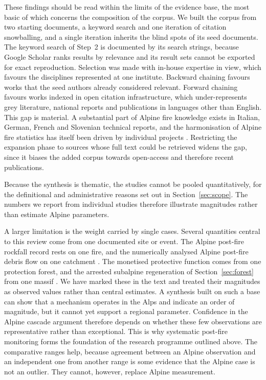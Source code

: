 \documentclass[11pt,a4paper]{article}
\begin{document}
\label{sec:limitations}
These findings should be read within the limits of the evidence base, the most basic of which concerns the composition of the corpus. We built the corpus from two starting documents, a keyword search and one iteration of citation snowballing, and a single iteration inherits the blind spots of its seed documents. The keyword search of Step~2 is documented by its search strings, because Google Scholar ranks results by relevance and its result sets cannot be exported for exact reproduction. Selection was made with in-house expertise in view, which favours the disciplines represented at one institute. Backward chaining favours works that the seed authors already considered relevant. Forward chaining favours works indexed in open citation infrastructure, which under-represents grey literature, national reports and publications in languages other than English. This gap is material. A substantial part of Alpine fire knowledge exists in Italian, German, French and Slovenian technical reports, and the harmonisation of Alpine fire statistics has itself been driven by individual projects \citep{valese_wildfires_2011}. Restricting the expansion phase to sources whose full text could be retrieved widens the gap, since it biases the added corpus towards open-access and therefore recent publications.

Because the synthesis is thematic, the studies cannot be pooled quantitatively, for the definitional and administrative reasons set out in Section~\ref{sec:scope}. The numbers we report from individual studies therefore illustrate magnitudes rather than estimate Alpine parameters.

A larger limitation is the weight carried by single cases. Several quantities central to this review come from one documented site or event. The Alpine post-fire rockfall record rests on one fire, and the numerically analysed Alpine post-fire debris flow on one catchment \citep{melzner_brief_2019, laporta_postwildfire_2025}. The monetised protective function comes from one protection forest, and the arrested subalpine regeneration of Section~\ref{sec:forest} from one massif \citep{moos_climate_2021, degiuli_arrested_2024}. We have marked these in the text and treated their magnitudes as observed values rather than central estimates. A synthesis built on such a base can show that a mechanism operates in the Alps and indicate an order of magnitude, but it cannot yet support a regional parameter. Confidence in the Alpine cascade argument therefore depends on whether these few observations are representative rather than exceptional. This is why systematic post-fire monitoring forms the foundation of the research programme outlined above. The comparative ranges help, because agreement between an Alpine observation and an independent one from another range is some evidence that the Alpine case is not an outlier. They cannot, however, replace Alpine measurement.
\end{document}
